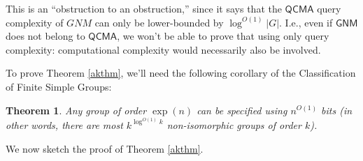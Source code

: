 \documentclass[11pt]{report}
\theoremstyle{plain}
\newtheorem{theorem}{Theorem}[section]
\theoremstyle{definition}
\begin{document}
This is an ``obstruction to an obstruction,'' since it says that the $\mathsf{QCMA}$ query complexity of $GNM$ can only be lower-bounded by $\log^{O(1)} |G|$.
I.e., even if $\mathsf{GNM}$ does not belong to $\mathsf{QCMA}$, we
won't be able to prove that using only query complexity: computational complexity would necessarily also be involved.

To prove Theorem \ref{akthm}, we'll need the following corollary of the Classification of Finite Simple Groups:

\begin{theorem}
\label{finitesimple}
  Any group of order $\exp ( n)$ can be specified using $n^{O ( 1)}$ bits (in other words, there are most $k^{\log^{O(1)}k}$ non-isomorphic groups of order $k$).
\end{theorem}

We now sketch the proof of Theorem \ref{akthm}.
\end{document}
